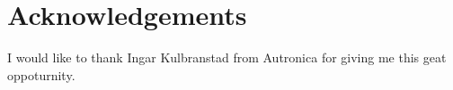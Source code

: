 \section*{\Large Acknowledgements}

I would like to thank Ingar Kulbranstad from Autronica for giving me this geat oppoturnity. 